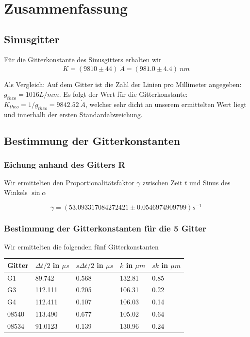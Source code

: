  \section{Zusammenfassung}

\subsection{Sinusgitter} %

Für die Gitterkonstante des Sinusgitters erhalten wir
$$\boxed{K=(9810 \pm 44) \ \mathring A = (981.0 \pm 4.4) \ nm}$$

Als Vergleich: Auf dem Gitter ist die Zahl der Linien pro Millimeter angegeben: \\ $g_{theo}=1016 L/mm$. Es folgt der Wert f\"ur die Gitterkonstante: $K_{theo} = 1/g_{theo} = 9842.52 \ \mathring A$, welcher sehr dicht an unserem ermittelten Wert liegt und innerhalb der ersten Standardabweichung.

\subsection{Bestimmung der Gitterkonstanten}

\subsubsection{Eichung anhand des Gitters R}

Wir ermittelten den Proportionalitätsfaktor $\gamma$ zwischen Zeit $t$ und Sinus des Winkels $\sin \alpha$ 

$$ \gamma = (53.093317084272421 \pm 0.0546974909799) s^{-1} $$


\subsubsection{Bestimmung der Gitterkonstanten f\"ur die 5 Gitter}

Wir ermittelten die folgenden fünf Gitterkonstanten
\begin{center}
\begin{tabular}{lllll}
\toprule 
Gitter & $\Delta t /2$ in $\mu s$ & $s\Delta t /2$ in $\mu s$ & $k$ in $\mu m$ & $sk$ in $\mu m$\\
\midrule
G1 & 89.742 & 0.568 & 132.81 & 0.85\\
G3 & 112.111 & 0.205 & 106.31 & 0.22\\
G4 & 112.411 & 0.107 & 106.03 & 0.14\\
08540 & 113.490 & 0.677 & 105.02 & 0.64\\
08534 & 91.0123 & 0.139 & 130.96 & 0.24\\
\bottomrule
\end{tabular} 
\end{center}


